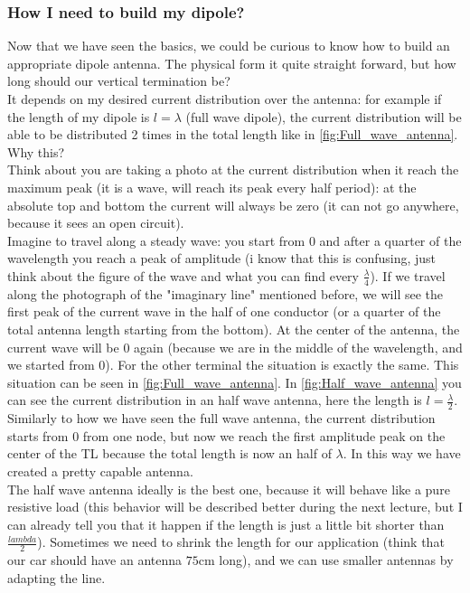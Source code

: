 \subsubsection*{How I need to build my dipole?}
Now that we have seen the basics, we could be curious to know how to build an appropriate dipole antenna. The physical form it quite straight forward, but how long should our vertical termination be?\\
It depends on my desired current distribution over the antenna: for example if the length of my dipole is $l=\lambda$ (full wave dipole), the current distribution will be able to be distributed 2 times in the total length like in \cref{fig:Full_wave_antenna}. Why this?\\
Think about you are taking a photo at the current distribution when it reach the maximum peak (it is a wave, will reach its peak every half period): at the absolute top and bottom the current will always be zero (it can not go anywhere, because it sees an open circuit).\\
Imagine to travel along a steady wave: you start from 0 and after a quarter of the wavelength you reach a peak of amplitude (i know that this is confusing, just think about the figure of the wave and what you can find every $\frac{\lambda}{4}$). If we travel along the photograph of the "imaginary line" mentioned before, we will see the first peak of the current wave in the half of one conductor (or a quarter of the total antenna length starting from the bottom). At the center of the antenna, the current wave will be 0 again (because we are in the middle of the wavelength, and we started from 0). For the other terminal the situation is exactly the same. This situation can be seen in \cref{fig:Full_wave_antenna}.
In \cref{fig:Half_wave_antenna} you can see the current distribution in an half wave antenna, here the length is $l=\frac{\lambda}{2}$.\\
Similarly to how we have seen the full wave antenna, the current distribution starts from 0 from one node, but now we reach the first amplitude peak on the center of the TL because the total length is now an half of $\lambda$. In this way we have created a pretty capable antenna.\\
The half wave antenna ideally is the best one, because it will behave like a pure resistive load\cite{Antenne_appunti_tlc} (this behavior will be described better during the next lecture, but I can already tell you that it happen if the length is just a little bit shorter than $\frac{lambda}{2}$). Sometimes we need to shrink the length for our application (think that our car should have an antenna $75\si{\centi\metre}$ long), and we can use smaller antennas by adapting the line.
